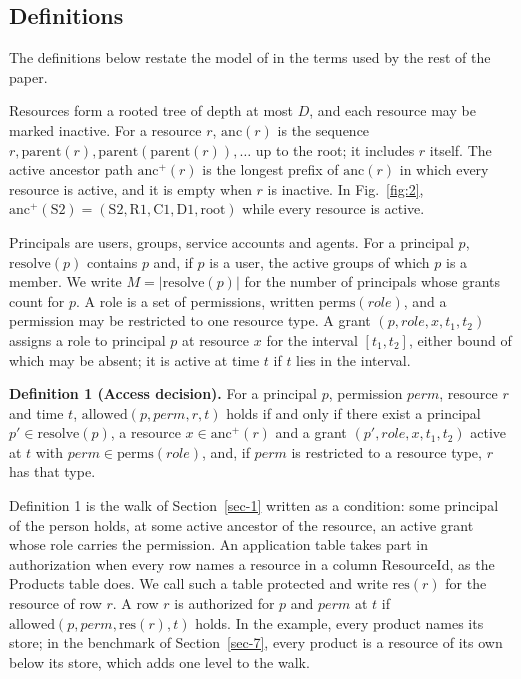 \documentclass[conference]{IEEEtran}
\begin{document}
\subsection{Definitions}\label{sec-2-3}

The definitions below restate the model of \cite{ref8} in the terms used by the rest of the paper.

Resources form a rooted tree of depth at most \(D\), and each resource may be marked inactive. For a resource \(r\), \(\mathrm{anc}(r)\) is the sequence \(r, \mathrm{parent}(r), \mathrm{parent}(\mathrm{parent}(r)), \ldots\) up to the root; it includes \(r\) itself. The active ancestor path \(\mathrm{anc}^{+}(r)\) is the longest prefix of \(\mathrm{anc}(r)\) in which every resource is active, and it is empty when \(r\) is inactive. In Fig.~\ref{fig:2}, \(\mathrm{anc}^{+}(\mathrm{S2}) = (\mathrm{S2}, \mathrm{R1}, \mathrm{C1}, \mathrm{D1}, \mathrm{root})\) while every resource is active.

Principals are users, groups, service accounts and agents. For a principal \(p\), \(\mathrm{resolve}(p)\) contains \(p\) and, if \(p\) is a user, the active groups of which \(p\) is a member. We write \(M = |\mathrm{resolve}(p)|\) for the number of principals whose grants count for \(p\). A role is a set of permissions, written \(\mathrm{perms}(\mathit{role})\), and a permission may be restricted to one resource type. A grant \((p, \mathit{role}, x, t_1, t_2)\) assigns a role to principal \(p\) at resource \(x\) for the interval \([t_1, t_2]\), either bound of which may be absent; it is active at time \(t\) if \(t\) lies in the interval.

\textbf{Definition 1 (Access decision).} For a principal \(p\), permission \(\mathit{perm}\), resource \(r\) and time \(t\), \(\mathrm{allowed}(p, \mathit{perm}, r, t)\) holds if and only if there exist a principal \(p' \in \mathrm{resolve}(p)\), a resource \(x \in \mathrm{anc}^{+}(r)\) and a grant \((p', \mathit{role}, x, t_1, t_2)\) active at \(t\) with \(\mathit{perm} \in \mathrm{perms}(\mathit{role})\), and, if \(\mathit{perm}\) is restricted to a resource type, \(r\) has that type.

Definition 1 is the walk of Section~\ref{sec-1} written as a condition: some principal of the person holds, at some active ancestor of the resource, an active grant whose role carries the permission. An application table takes part in authorization when every row names a resource in a column ResourceId, as the Products table does. We call such a table protected and write \(\mathrm{res}(r)\) for the resource of row \(r\). A row \(r\) is authorized for \(p\) and \(\mathit{perm}\) at \(t\) if \(\mathrm{allowed}(p, \mathit{perm}, \mathrm{res}(r), t)\) holds. In the example, every product names its store; in the benchmark of Section~\ref{sec-7}, every product is a resource of its own below its store, which adds one level to the walk.
\end{document}
